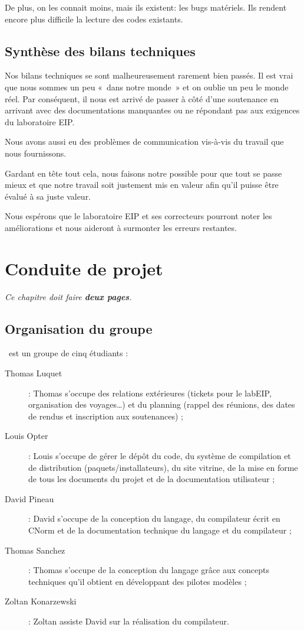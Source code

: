 \documentclass[francais]{rtxreport}
\begin{document}
De plus, on les connait moins, mais ils existent: les bugs matériels. Ils
rendent encore plus difficile la lecture des codes existants.

\section{Synthèse des bilans techniques}

Nos bilans techniques se sont malheureusement rarement bien passés. Il est vrai
que nous sommes un peu «~dans notre monde~» et on oublie un peu le monde réel.
Par conséquent, il nous est arrivé de passer à côté d’une soutenance en
arrivant avec des documentations manquantes ou ne répondant pas aux exigences
du laboratoire EIP.

Nous avons aussi eu des problèmes de communication vis-à-vis du travail que
nous fournissons.

Gardant en tête tout cela, nous faisons notre possible pour que tout se passe
mieux et que notre travail soit justement mis en valeur afin qu’il puisse être
évalué à sa juste valeur.

Nous espérons que le laboratoire EIP et ses correcteurs pourront noter les
améliorations et nous aideront à surmonter les erreurs restantes.

\chapter{Conduite de projet}

\emph{Ce chapitre doit faire \textbf{deux pages}.}

\section{Organisation du groupe}

\rtx\ est un groupe de cinq étudiants :
\begin{description}
\item[Thomas Luquet] : Thomas s'occupe des relations extérieures (tickets pour
le labEIP, organisation des voyages\ldots) et du planning (rappel des réunions,
des dates de rendus et inscription aux soutenances) ;
\item[Louis Opter] : Louis s'occupe de gérer le dépôt du code, du système de
compilation et de distribution (paquets/installateurs), du site vitrine, de la
mise en forme de tous les documents du projet et de la documentation
utilisateur ;
\item[David Pineau] : David s'occupe de la conception du langage, du
compilateur écrit en CNorm et de la documentation technique du langage et du
compilateur ;
\item[Thomas Sanchez] : Thomas s'occupe de la conception du langage grâce aux
concepts techniques qu'il obtient en développant des pilotes modèles ;
\item[Zoltan Konarzewski] : Zoltan assiste David sur la réalisation du
compilateur.
\end{description}
\end{document}
